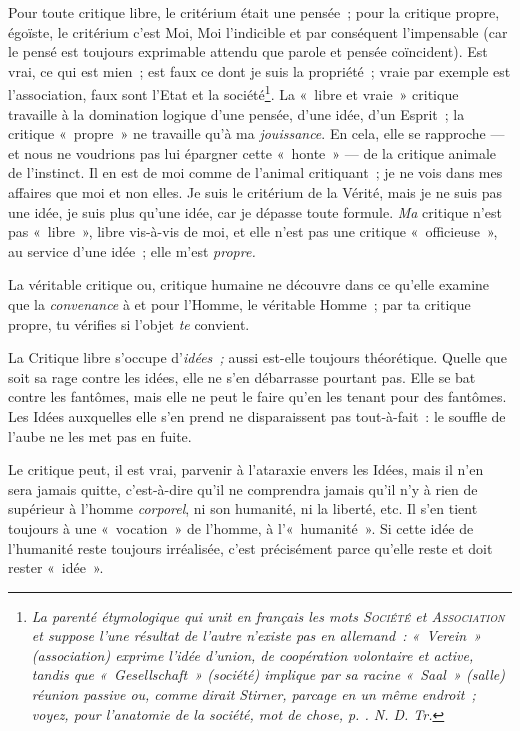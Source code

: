 \documentclass[french,twoside]{book} %
\begin{document}
Pour toute critique libre, le critérium était une pensée ; pour la critique propre, égoïste, le critérium c’est Moi, Moi l’indicible et par conséquent l’impensable (car le pensé est toujours exprimable attendu que parole et pensée coïncident). Est vrai, ce qui est mien ; est faux ce dont je suis la propriété ; vraie par exemple est l’association, faux sont l’Etat et la société\footnote{ \noindent \emph{La parenté étymologique qui unit en français les mots \emph{S{\scshape ociété}} et \emph{A{\scshape ssociation}} et suppose l’une résultat de l’autre n’existe pas en allemand : « Verein » (association) exprime l’idée d’union, de coopération volontaire et active, tandis que « Gesellschaft » (société) implique par sa racine « Saal » (salle) réunion passive ou, comme dirait Stirner, parcage en un même endroit ; voyez, pour l’anatomie de la société, mot de chose, p. \hyperref[p261]{}. N. D. Tr.}
 }. La « libre et vraie » critique travaille à la domination logique d’une pensée, d’une idée, d’un Esprit ; la critique « propre » ne travaille qu’à ma \emph{jouissance}. En cela, elle se rapproche — et nous ne voudrions  pas lui épargner cette « honte » — de la critique animale de l’instinct. Il en est de moi comme de l’animal critiquant ; je ne vois dans mes affaires que moi et non elles. Je suis le critérium de la Vérité, mais je ne suis pas une idée, je suis plus qu’une idée, car je dépasse toute formule. \emph{Ma} critique n’est pas « libre », libre vis-à-vis de moi, et elle n’est pas une critique « officieuse », au service d’une idée ; elle m’est \emph{propre.}\par
La véritable critique ou, critique humaine ne découvre dans ce qu’elle examine que la \emph{convenance} à et pour l’Homme, le véritable Homme ; par ta critique propre, tu vérifies si l’objet \emph{te} convient.\par
La Critique libre s’occupe d’\emph{idées ;} aussi est-elle toujours théorétique. Quelle que soit sa rage contre les idées, elle ne s’en débarrasse pourtant pas. Elle se bat contre les fantômes, mais elle ne peut le faire qu’en les tenant pour des fantômes. Les Idées auxquelles elle s’en prend ne disparaissent pas tout-à-fait : le souffle de l’aube ne les met pas en fuite.\par
Le critique peut, il est vrai, parvenir à l’ataraxie envers les Idées, mais il n’en sera jamais quitte, c’est-à-dire qu’il ne comprendra jamais qu’il n’y à rien de supérieur à l’homme \emph{corporel}, ni son humanité, ni la liberté, etc. Il s’en tient toujours à une « vocation » de l’homme, à l’« humanité ». Si cette idée de l’humanité reste toujours irréalisée, c’est précisément parce qu’elle reste et doit rester « idée ».\par
\end{document}
